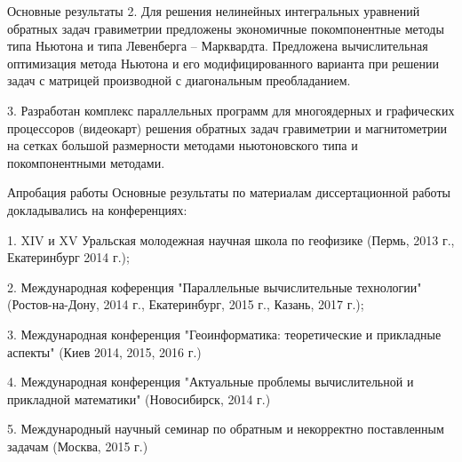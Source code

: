 \documentclass[10pt,pdf, mathserif, hyperref={unicode}]{beamer}
\begin{document}
\begin{frame}{Основные результаты}
	2. Для решения нелинейных интегральных уравнений обратных задач гравиметрии предложены экономичные покомпонентные методы 
	типа Ньютона и типа Левенберга – Марквардта. Предложена вычислительная оптимизация метода 
	Ньютона и его модифицированного варианта при решении задач 
	с матрицей производной с диагональным преобладанием. 
	

	\vskip 0.5cm
	3. Разработан комплекс параллельных программ для многоядерных и графических процессоров (видеокарт) решения обратных задач гравиметрии и магнитометрии на сетках большой размерности методами ньютоновского типа и покомпонентными методами.  

\end{frame}
	
\begin{frame}{Апробация работы}
	Основные результаты по материалам диссертационной работы докладывались на конференциях:
	
	
	1. XIV и XV Уральская молодежная научная школа по геофизике (Пермь, 2013 г., Екатеринбург 2014 г.);
	
	2. Международная коференция "Параллельные вычислительные технологии" (Ростов-на-Дону, 2014 г., Екатеринбург, 2015 г., Казань, 2017 г.);
	
	3. Международная конференция "Геоинформатика: теоретические и прикладные аспекты" (Киев 2014, 2015, 2016 г.)
	
	4. Международная конференция "Актуальные проблемы вычислительной и прикладной математики" (Новосибирск, 2014 г.)
	
	5. Международный научный семинар по обратным и некорректно поставленным задачам (Москва, 2015 г.)
\end{frame}
\end{document}
